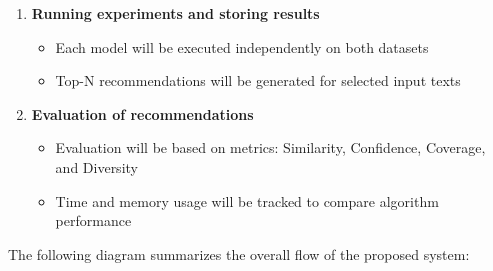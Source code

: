 \documentclass[\myFontSize,a4paper,oneside,english,hidelinks]{article}
\begin{document}
\begin{enumerate}
    \item \textbf{Running experiments and storing results}
    \begin{itemize}
        \item Each model will be executed independently on both datasets
        \item Top-N recommendations will be generated for selected input texts
    \end{itemize}

    \item \textbf{Evaluation of recommendations}
    \begin{itemize}
        \item Evaluation will be based on metrics: Similarity, Confidence, Coverage, and Diversity
        \item Time and memory usage will be tracked to compare algorithm performance
    \end{itemize}


\end{enumerate}
%
The following diagram summarizes the overall flow of the proposed system:
\end{document}
